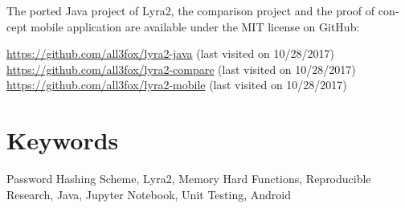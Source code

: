 \begin{otherlanguage}{english}
The ported Java project of Lyra2, the comparison project and the proof of concept mobile application are available under the MIT license on GitHub:

\url{https://github.com/all3fox/lyra2-java} (last visited on 10/28/2017)\\
\url{https://github.com/all3fox/lyra2-compare} (last visited on 10/28/2017)\\
\url{https://github.com/all3fox/lyra2-mobile} (last visited on 10/28/2017)

\bigskip

\section*{Keywords}
Password Hashing Scheme, Lyra2, Memory Hard Functions, Reproducible Research, Java, Jupyter Notebook, Unit Testing, Android

\end{otherlanguage}
